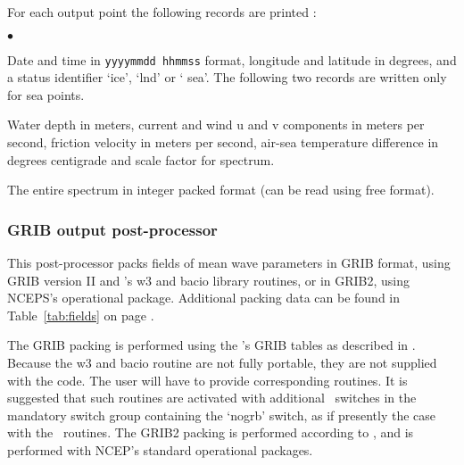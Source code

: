 \noindent
For each output point the following records are printed :
\begin{list}{$\bullet$}{\itemsep 0mm \parsep 0mm}
\item Date and time in {\tt yyyymmdd hhmmss} format, longitude and latitude in
      degrees, and a status identifier `{\F ice}', `{\F lnd}' or `{\F
      sea}'. The following two records are written only for sea points.
\item Water depth in meters, current and wind u and v components in meters per
      second, friction velocity in meters per second, air-sea temperature
      difference in degrees centigrade and scale factor for spectrum.
\item The entire spectrum in integer packed format (can be read using free
      format).
\end{list}


\pb
\vsssub
\subsubsection{GRIB output post-processor} \label{sec:post_g}
\vsssub



\vspace{\baselineskip} 
\noindent
This post-processor packs fields of mean wave parameters in GRIB format, using
GRIB version II and \ncep's w3 and bacio library routines, or in GRIB2, using
NCEPS's operational package. Additional packing data can be found in
Table~\ref{tab:fields} on page \pageref{tab:fields}.

The GRIB packing is performed using the \ncep's GRIB tables as described in
\cite{rep:GRIB}. Because the w3 and bacio routine are not fully portable, they
are not supplied with the code. The user will have to provide corresponding
routines. It is suggested that such routines are activated with additional
\ws\ switches in the mandatory switch group containing the `{\F nogrb}'
switch, as if presently the case with the \ncep\ routines.  The GRIB2 packing
is performed according to \cite{rep:GRIB2}, and is performed with NCEP's
standard operational packages.

